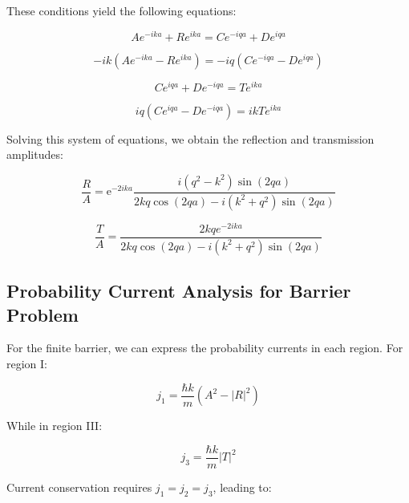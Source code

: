 \documentclass[italian]{HKNdocument}
\begin{document}
These conditions yield the following equations:

\begin{equation}
A e^{-i k a}+R e^{i k a}=C e^{-i q a}+D e^{i q a} \label{eq:6.55}
\end{equation}

\begin{equation}
-i k\left(A e^{-i k a}-R e^{i k a}\right)=-i q\left(C e^{-i q a}-D e^{i q a}\right) \label{eq:6.56}
\end{equation}

\begin{equation}
C e^{i q a}+D e^{-i q a}=T e^{i k a} \label{eq:6.57}
\end{equation}

\begin{equation}
i q\left(C e^{i q a}-D e^{-i q a}\right)=i k T e^{i k a} \label{eq:6.58}
\end{equation}

Solving this system of equations, we obtain the reflection and transmission amplitudes:

\begin{equation}
\frac{R}{A}=\mathrm{e}^{-2 i k a} \frac{i\left(q^{2}-k^{2}\right) \sin (2 q a)}{2 k q \cos (2 q a)-i\left(k^{2}+q^{2}\right) \sin (2 q a)} \label{eq:6.59}
\end{equation}

\begin{equation}
\frac{T}{A}=\frac{2 k q e^{-2 i k a}}{2 k q \cos (2 q a)-i\left(k^{2}+q^{2}\right) \sin (2 q a)} \label{eq:6.60}
\end{equation}


\subsection{Probability Current Analysis for Barrier Problem}

For the finite barrier, we can express the probability currents in each region. For region I:

\begin{equation}
j_{1}=\frac{\hbar k}{m}\left(A^{2}-|R|^{2}\right) \label{eq:6.61}
\end{equation}

While in region III:

\begin{equation}
j_{3}=\frac{\hbar k}{m}|T|^{2} \label{eq:6.62}
\end{equation}

Current conservation requires $j_1 = j_2 = j_3$, leading to:
\end{document}
